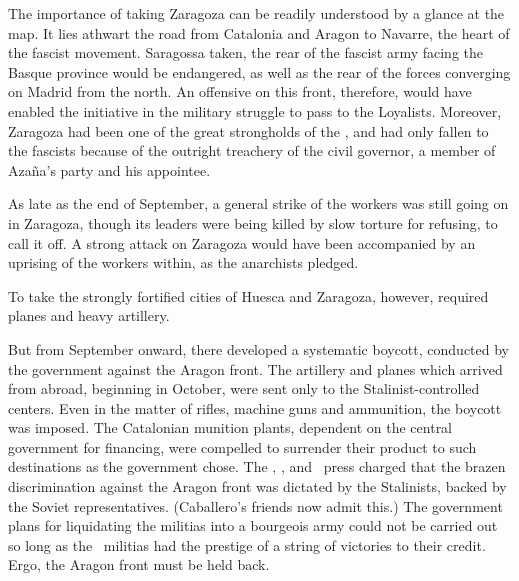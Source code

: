 \indexCNT{}
The importance of taking Zaragoza can be readily understood by a glance at the map. It lies athwart the road from Catalonia and Aragon to Navarre, the heart of the fascist movement. Saragossa taken, the rear of the fascist army facing the Basque province would be endangered, as well as the rear of the forces converging on Madrid from the north. An offensive on this front, therefore, would have enabled the initiative in the military struggle to pass to the Loyalists. Moreover, Zaragoza had been one of the great strongholds of the \CNT\kn, and had only fallen to the fascists because of the outright treachery of the civil governor, a member of Azaña’s party and his appointee.

As late as the end of September, a general strike of the workers was still going on in Zaragoza, though its leaders were being killed by slow torture for refusing, to call it off. A strong attack on Zaragoza would have been accompanied by an uprising of the workers within, as the anarchists pledged.

To take the strongly fortified cities of Huesca and Zaragoza, however\kn, required planes and heavy artillery.

But from September onward, there developed a systematic boycott, conducted by the government against the Aragon front. The artillery and planes which arrived from abroad, beginning in October, were sent only to the Stalinist-controlled centers. Even in the matter of rifles, machine guns and ammunition, the boycott was imposed. The Catalonian munition plants, dependent on the central government for financing, were compelled to surrender their product to such destinations as the government chose. The \CNT\kn, \FAI, and \POUM\ press charged that the brazen discrimination against the Aragon front was dictated by the Stalinists, backed by the Soviet representatives. (Caballero’s friends now admit this.) The government plans for liquidating the militias into a bourgeois army could not be carried out so long as the \CNT\ militias had the prestige of a string of victories to their credit. Ergo, the Aragon front must be held back.

